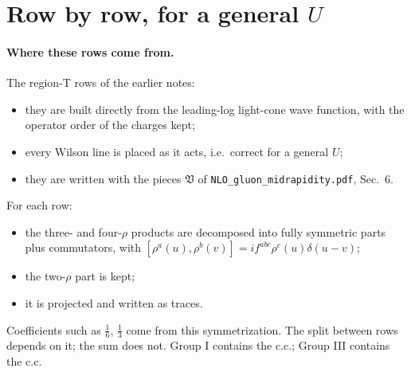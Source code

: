 \documentclass[10pt]{article}
\numberwithin{equation}{section}
\begin{document}
\section{Row by row, for a general \texorpdfstring{$U$}{U}}\label{sec:rows}
\paragraph{Where these rows come from.} The region-T rows of the earlier notes:
\begin{itemize}
\item they are built directly from the leading-log light-cone wave function, with the operator order of the charges kept;
\item every Wilson line is placed as it acts, i.e.\ correct for a general $U$;
\item they are written with the pieces $\mathfrak V$ of \texttt{NLO\_gluon\_midrapidity.pdf}, Sec.~6.
\end{itemize}
For each row:
\begin{itemize}
\item the three- and four-$\rho$ products are decomposed into fully symmetric parts plus commutators, with $[\rho^a(u),\rho^b(v)]=if^{abc}\rho^c(u)\delta(u-v)$;
\item the two-$\rho$ part is kept;
\item it is projected and written as traces.
\end{itemize}
Coefficients such as $\frac16$, $\frac13$ come from this symmetrization. The split between rows depends on it; the sum does not. Group I contains the c.c.; Group III contains the c.c.
\end{document}
